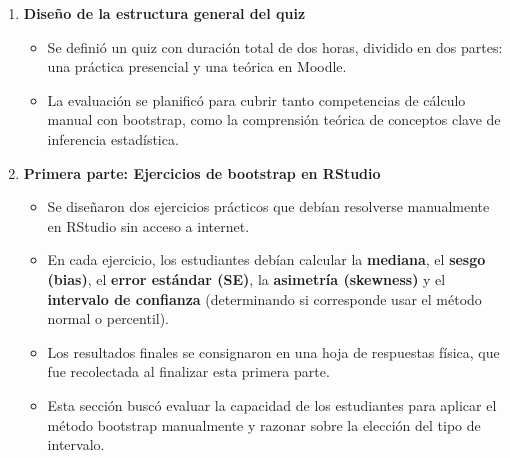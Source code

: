 \documentclass[letter,oneside,12pt,spanish]{report}
\begin{document}
\begin{enumerate}
	\item \textbf{Diseño de la estructura general del quiz}  
	\begin{itemize}
		\item Se definió un quiz con duración total de dos horas, dividido en dos partes: una práctica presencial y una teórica en Moodle.
		\item La evaluación se planificó para cubrir tanto competencias de cálculo manual con bootstrap, como la comprensión teórica de conceptos clave de inferencia estadística.
	\end{itemize}
	
	\item \textbf{Primera parte: Ejercicios de bootstrap en RStudio}  
	\begin{itemize}
		\item Se diseñaron dos ejercicios prácticos que debían resolverse manualmente en RStudio sin acceso a internet.
		\item En cada ejercicio, los estudiantes debían calcular la \textbf{mediana}, el \textbf{sesgo (bias)}, el \textbf{error estándar (SE)}, la \textbf{asimetría (skewness)} y el \textbf{intervalo de confianza} (determinando si corresponde usar el método normal o percentil).
		\item Los resultados finales se consignaron en una hoja de respuestas física, que fue recolectada al finalizar esta primera parte.
		\item Esta sección buscó evaluar la capacidad de los estudiantes para aplicar el método bootstrap manualmente y razonar sobre la elección del tipo de intervalo.
	\end{itemize}
	

\end{enumerate}
\end{document}
